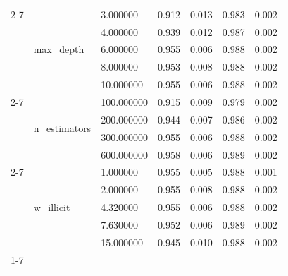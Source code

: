 \begin{table}
\begin{tabular}{lllllll}
\cline{2-7}
 & \multirow[t]{5}{*}{max\_depth} & 3.000000 & 0.912 & 0.013 & 0.983 & 0.002 \\
 &  & 4.000000 & 0.939 & 0.012 & 0.987 & 0.002 \\
 &  & 6.000000 & 0.955 & 0.006 & 0.988 & 0.002 \\
 &  & 8.000000 & 0.953 & 0.008 & 0.988 & 0.002 \\
 &  & 10.000000 & 0.955 & 0.006 & 0.988 & 0.002 \\
\cline{2-7}
 & \multirow[t]{4}{*}{n\_estimators} & 100.000000 & 0.915 & 0.009 & 0.979 & 0.002 \\
 &  & 200.000000 & 0.944 & 0.007 & 0.986 & 0.002 \\
 &  & 300.000000 & 0.955 & 0.006 & 0.988 & 0.002 \\
 &  & 600.000000 & 0.958 & 0.006 & 0.989 & 0.002 \\
\cline{2-7}
 & \multirow[t]{5}{*}{w\_illicit} & 1.000000 & 0.955 & 0.005 & 0.988 & 0.001 \\
 &  & 2.000000 & 0.955 & 0.008 & 0.988 & 0.002 \\
 &  & 4.320000 & 0.955 & 0.006 & 0.988 & 0.002 \\
 &  & 7.630000 & 0.952 & 0.006 & 0.989 & 0.002 \\
 &  & 15.000000 & 0.945 & 0.010 & 0.988 & 0.002 \\
\cline{1-7} \cline{2-7}
\bottomrule
\end{tabular}
\end{table}
